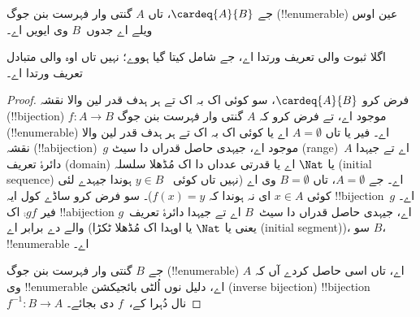 \documentclass[../../../include/open-logic-section]{subfiles}
\begin{document}
\begin{prop}
جے $\cardeq{A}{B}$، تاں $A$ گنتی وار فہرست بنن جوگ
(!!{enumerable}) عین اوس ویلے اے جدوں~$B$ وی ایویں اے۔
\end{prop}

\begin{editorial}
اگلا ثبوت  والی تعریف ورتدا اے، جے
 شامل کیتا گیا ہووے؛ نہیں تاں اوہ
 والی متبادل تعریف ورتدا اے۔
\end{editorial}

\begin{proof}
فرض کرو $\cardeq{A}{B}$، سو کوئی اک بہ اک تے ہر ہدف قدر لین والا
نقشہ (!!{bijection}) $f \colon A \to B$ موجود اے، تے فرض کرو کہ
$A$ گنتی وار فہرست بنن جوگ (!!{enumerable}) اے۔
{
  فیر یا تاں $A = \emptyset$ اے یا کوئی اک بہ اک تے ہر ہدف قدر لین
  والا نقشہ (!!a{bijection})~$g$ موجود اے، جیہدی حاصل قدراں دا سیٹ
  (range)~$A$ اے تے جیہدا دائرۂ تعریف (domain) یا $\Nat$ اے یا قدرتی
  عدداں دا اک مُڈھلا سلسلہ (initial sequence) اے۔ جے
  $A = \emptyset$، تاں $B = \emptyset$ وی اے (نہیں تاں کوئی
  ~$y \in B$ ہوندا جیہدے لئی کوئی $x \in A$ ای نہ ہوندا کہ
  $f(x) = y$)۔ سو فرض کرو ساڈے کول ایہ !!{bijection}~$g$ اے۔ فیر
  $\comp{g}{f}$ اک !!a{bijection} اے، جیہدی حاصل قدراں دا سیٹ~$B$
  اے تے جیہدا دائرۂ تعریف~$g$ والے دے برابر اے (یعنی یا $\Nat$ یا
  اوہدا اک مُڈھلا ٹکڑا (initial segment))، سو $B$، !!{enumerable}
  اے۔}

جے $B$ گنتی وار فہرست بنن جوگ (!!{enumerable}) اے، تاں اسی حاصل
کردے آں کہ $A$ وی !!{enumerable} اے، دلیل نوں اُلٹی بائجیکشن
(inverse bijection) !!{bijection} $f^{-1}\colon B \to A$ نال دُہرا
کے،~$f$ دی بجائے۔
\end{proof}
\end{document}

